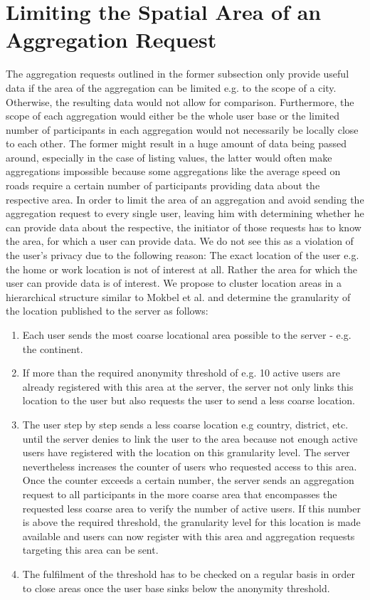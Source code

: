  \section{Limiting the Spatial Area of an Aggregation Request}
 The aggregation requests outlined in the former subsection only provide useful data if the area of the aggregation can be limited e.g. to the scope of a city. Otherwise, the resulting data would not allow for comparison. Furthermore, the scope of each aggregation would either be the whole user base or the limited number of participants in each aggregation would not necessarily be locally close to each other. The former might result in a huge amount of data being passed around, especially in the case of listing values, the latter would often make aggregations impossible because some aggregations like the average speed on roads require a certain number of participants providing data about the respective area. 
 In order to limit the area of an aggregation and avoid sending the aggregation request to every single user, leaving him with determining whether he can provide data about the respective, the initiator of those requests has to know the area, for which a user can provide data.
 We do not see this as a violation of the user's privacy due to the following reason: The exact location of the user e.g. the home or work location is not of interest at all. Rather the area for which the user can provide data is of interest. We propose to cluster location areas in a hierarchical structure similar to Mokbel et al. \parencite{casper} and determine the granularity of the location published to the server as follows:
\begin{enumerate}
	\item Each user sends the most coarse locational area possible to the server - e.g. the continent.
	\item If more than the required anonymity threshold of e.g. 10 active users are already registered with this area at the server, the server not only links this location to the user but also requests the user to send a less coarse location.
	\item The user step by step sends a less coarse location e.g country, district, etc. until the server denies to link the user to the area because not enough active users have registered with the location on this granularity level. The server nevertheless increases the counter of users who requested access to this area. Once the counter exceeds a certain number, the server sends an aggregation request to all participants in the more coarse area that encompasses the requested less coarse area to verify the number of active users. If this number is above the required threshold, the granularity level for this location is made available and users can now register with this area and aggregation requests targeting this area can be sent.
	\item The fulfilment of the threshold has to be checked on a regular basis in order to close areas once the user base sinks below the anonymity threshold.
\end{enumerate}
